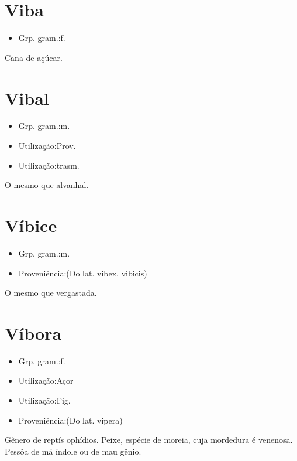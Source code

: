 \documentclass{article}
\begin{document}
\section{Viba}
\begin{itemize}
\item {Grp. gram.:f.}
\end{itemize}
Cana de açúcar.
\section{Vibal}
\begin{itemize}
\item {Grp. gram.:m.}
\end{itemize}
\begin{itemize}
\item {Utilização:Prov.}
\end{itemize}
\begin{itemize}
\item {Utilização:trasm.}
\end{itemize}
O mesmo que \textunderscore alvanhal\textunderscore .
\section{Víbice}
\begin{itemize}
\item {Grp. gram.:m.}
\end{itemize}
\begin{itemize}
\item {Proveniência:(Do lat. \textunderscore vibex\textunderscore , \textunderscore vibicis\textunderscore )}
\end{itemize}
O mesmo que \textunderscore vergastada\textunderscore .
\section{Víbora}
\begin{itemize}
\item {Grp. gram.:f.}
\end{itemize}
\begin{itemize}
\item {Utilização:Açor}
\end{itemize}
\begin{itemize}
\item {Utilização:Fig.}
\end{itemize}
\begin{itemize}
\item {Proveniência:(Do lat. \textunderscore vipera\textunderscore )}
\end{itemize}
Gênero de reptís ophídios.
Peixe, espécie de moreia, cuja mordedura é venenosa.
Pessôa de má índole ou de mau gênio.
\end{document}
